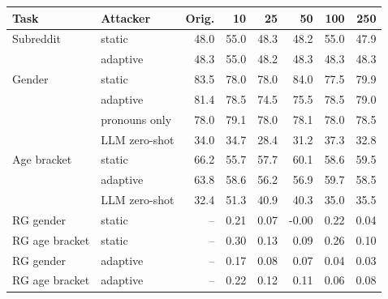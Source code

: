 \begin{tabular}{llrrrrrr}
\toprule
Task & Attacker & Orig. & 10 & 25 & 50 & 100 & 250 \\
\midrule
Subreddit & static & 48.0 & 55.0 & 48.3 & 48.2 & 55.0 & 47.9 \\
 & adaptive & 48.3 & 55.0 & 48.2 & 48.3 & 48.3 & 48.3 \\
\midrule
Gender & static & 83.5 & 78.0 & 78.0 & 84.0 & 77.5 & 79.9 \\
 & adaptive & 81.4 & 78.5 & 74.5 & 75.5 & 78.5 & 79.0 \\
 & pronouns only & 78.0 & 79.1 & 78.0 & 78.1 & 78.0 & 78.5 \\
 & LLM zero-shot & 34.0 & 34.7 & 28.4 & 31.2 & 37.3 & 32.8 \\
\midrule
Age bracket & static & 66.2 & 55.7 & 57.7 & 60.1 & 58.6 & 59.5 \\
 & adaptive & 63.8 & 58.6 & 56.2 & 56.9 & 59.7 & 58.5 \\
 & LLM zero-shot & 32.4 & 51.3 & 40.9 & 40.3 & 35.0 & 35.5 \\
\midrule
RG gender & static & -- & 0.21 & 0.07 & -0.00 & 0.22 & 0.04 \\
RG age bracket & static & -- & 0.30 & 0.13 & 0.09 & 0.26 & 0.10 \\
RG gender & adaptive & -- & 0.17 & 0.08 & 0.07 & 0.04 & 0.03 \\
RG age bracket & adaptive & -- & 0.22 & 0.12 & 0.11 & 0.06 & 0.08 \\
\bottomrule
\end{tabular}

